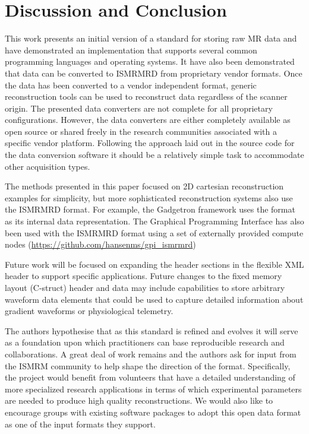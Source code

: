 \documentclass[12pt]{article}
\begin{document}
\section*{Discussion and Conclusion}
This work presents an initial version of a standard for storing raw MR data and have demonstrated an implementation that supports several common programming languages and operating systems. It have also been demonstrated that data can be converted to ISMRMRD from proprietary vendor formats. Once the data has been converted to a vendor independent format, generic reconstruction tools can be used to reconstruct data regardless of the scanner origin. The presented data converters are not complete for all proprietary configurations. However, the data converters are either completely available as open source or shared freely in the research communities associated with a specific vendor platform. Following the approach laid out in the source code for the data conversion software it should be a relatively simple task to accommodate other acquisition types. 

The methods presented in this paper focused on 2D cartesian reconstruction examples for simplicity, but more sophisticated reconstruction systems also use the ISMRMRD format. For example, the Gadgetron \cite{Hansen:2013aa} framework uses the format as its internal data representation. The Graphical Programming Interface \cite{Zwart:2014aa} has also been used with the ISMRMRD format using a set of externally provided compute nodes (\url{https://github.com/hansenms/gpi_ismrmrd})

Future work will be focused on expanding the header sections in the flexible XML header to support specific applications.  Future changes to the fixed memory layout (C-struct) header and data may include capabilities to store arbitrary waveform data elements that could be used to capture detailed information about gradient waveforms or physiological telemetry. 

The authors hypothesise that as this standard is refined and evolves it will serve as a foundation upon which practitioners can base reproducible research and collaborations.  A great deal of work remains and the authors ask for input from the ISMRM community to help shape the direction of the format. Specifically, the project would benefit from volunteers that have a detailed understanding of more specialized research applications in terms of which experimental parameters are needed to produce high quality reconstructions. We would also like to encourage groups with existing software packages to adopt this open data format as one of the input formats they support. 
\end{document}
